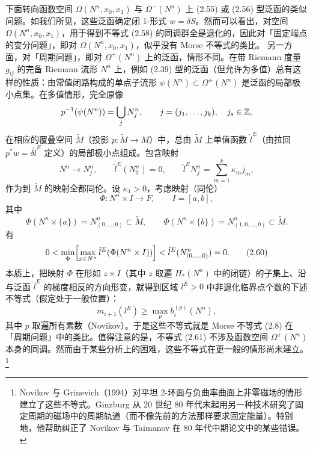 下面转向函数空间 $\Omega(N^n,x_0,x_1)$ 与 $\Omega^+(N^n)$ 上 (2.55) 或 (2.56) 型泛函的类似问题。如我们所见，这些泛函确定闭 1-形式 $w=\delta S$。然而可以看出，对空间 $\Omega(N^n,x_0,x_1)$，用于得到不等式 (2.58) 的同调群全是退化的，因此对「固定端点的变分问题」，即对 $\Omega(N^n,x_0,x_1)$，似乎没有 Morse 不等式的类比。
另一方面，对「周期问题」，即对 $\Omega^+(N^n)$ 上的泛函，情形不同。在带 Riemann 度量 $g_{ij}$ 的完备 Riemann 流形 $N^n$ 上，例如 (2.39) 型的泛函（但允许为多值）总有这样的性质：由常值闭路构成的单点子流形 $\psi(N^n)\subset\Omega^+(N^n)$ 是泛函的局部极小点集。在多值情形，完全原像
\[
  p^{-1}(\psi(N^n))=\bigcup_j N^n_j,\qquad j=(j_1,\dots,j_k),\quad j_s\in\mathbb{Z},
\]
在相应的覆叠空间 $\tilde M$（投影 $p:\tilde M\to M$）中，总由 $\tilde M$ 上单值函数 $\hat l^E$（由拉回 $p^*w=\delta\hat l^E$ 定义）的局部极小点组成。包含映射
\begin{equation}
  N^n\to N^n_j,\qquad \hat l^E(N^n_0)=0,\qquad
  \hat l^E N^n_j=\sum_{m=1}^k\kappa_mj_m, \tag{2.59}
\end{equation}
作为到 $\tilde M$ 的映射全都同伦。设 $\kappa_1>0$，考虑映射（同伦）
\[
  \Phi:N^n\times I\to F,\qquad I=[a,b],
\]
其中
\[
  \Phi(N^n\times\{a\})=N^n_{(0,\dots,0)}\subset\tilde M,\qquad
  \Phi(N^n\times\{b\})=N^n_{(1,0,\dots,0)}\subset\tilde M.
\]
有
\begin{equation}
  0<\min_\Phi\Bigl[\max_{x\in N^n}\hat l^E(\Phi(N^n\times I))\Bigr]
  <\hat l^E(N^n_{(0,\dots,0)})=0. \tag{2.60}
\end{equation}
本质上，把映射 $\Phi$ 在形如 $z\times I$（其中 $z$ 取遍 $H_*(N^n)$ 中的闭链）的子集上、沿与泛函 $\hat l^E$ 的梯度相反的方向形变，就得到区域 $l^E>0$ 中非退化临界点个数的下述不等式（假定处于一般位置）：
\begin{equation}
  m_{i+1}(l^E)\ge\max_p b_i^{(p)}(N^n), \tag{2.61}
\end{equation}
其中 $p$ 取遍所有素数（Novikov）。于是这些不等式就是 Morse 不等式 (2.8) 在「周期问题」中的类比。值得注意的是，不等式 (2.61) 不涉及函数空间 $\Omega^+(N^n)$ 本身的同调。然而由于某些分析上的困难，这些不等式在更一般的情形尚未建立。\footnote{Novikov 与 Grinevich（1994）对平坦 2-环面与负曲率曲面上非零磁场的情形建立了这些不等式。Ginzburg 从 20 世纪 80 年代末起用另一种技术研究了固定周期的磁场中的周期轨道（而不像先前的方法那样要求固定能量）。特别地，他帮助纠正了 Novikov 与 Taimanov 在 80 年代中期论文中的某些错误。}

